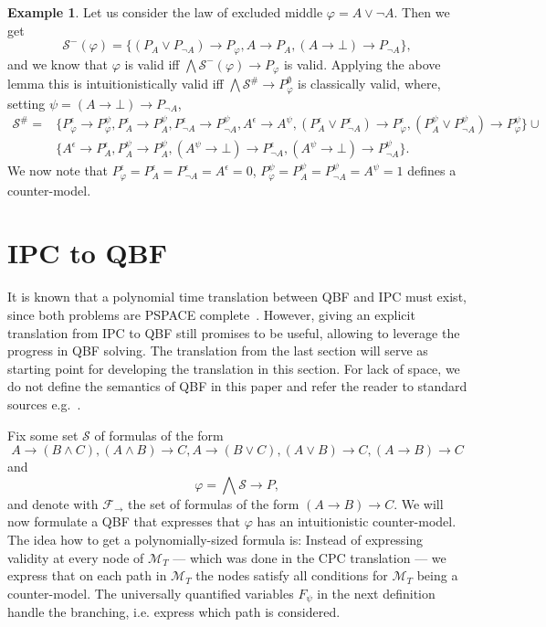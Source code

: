 \documentclass[a4paper,12pt]{report}
\theoremstyle{definition}
\theoremstyle{definition}
\theoremstyle{definition}
\theoremstyle{definition}
\theoremstyle{definition}
\theoremstyle{definition}
\newtheorem{example}[theorem]{Example}
\theoremstyle{definition}
\begin{document}
	\begin{example}
		Let us consider the law of excluded middle $\varphi = A\vee\neg A$. Then we get
		$$\mathcal S^-(\varphi) = \{(P_A\vee P_{\neg A})\to P_\varphi, A\to P_A, (A\to \bot)\to P_{\neg A}\},$$
		and we know that $\varphi$ is valid iff $\bigwedge \mathcal S^-(\varphi)\to P_\varphi$ is valid. Applying the above lemma this is intuitionistically valid iff $\bigwedge\mathcal S^\#\to P^\emptyset_\varphi$ is classically valid, where, setting $\psi = (A\to \bot)\to P_{\neg A}$,
		\begin{align*}
			\mathcal S^\# =&\{P_\varphi^\epsilon\to P_\varphi^{\psi}, P_A^\epsilon\to P_A^{\psi},P_{\neg A}^\epsilon\to P_{\neg A}^{\psi},A^\epsilon\to A^{\psi}, (P_A^\epsilon\vee P_{\neg A}^\epsilon)\to P_\varphi^\epsilon, (P_A^{\psi}\vee P_{\neg A}^{\psi})\to P_\varphi^{\psi}\}\cup\\ &\{A^\epsilon\to P_A^\epsilon, P_A^{\psi}\to P_A^{\psi}, (A^{\psi}\to \bot)\to P_{\neg A}^\epsilon, (A^{\psi}\to \bot)\to P_{\neg A}^{\psi}\}.
		\end{align*}
		We now note that $P_\varphi^\epsilon  = P_A^\epsilon = P_{\neg A}^\epsilon = A^\epsilon = 0$, $P_{\varphi}^{\psi} = P_A^{\psi} =  P_{\neg A}^{\psi} = A^{\psi} = 1$ defines a counter-model.
	\end{example}
	
	\section{IPC to QBF}
	
	It is known that a polynomial time translation between QBF and IPC must exist, since both problems are PSPACE complete~\cite{garey1979computers, statman1979intuitionistic}.
	However, giving an explicit translation from IPC to QBF still promises to be useful, allowing to leverage the progress in QBF solving.
	The translation from the last section will serve as starting point for developing the translation in this section.
	For lack of space, we do not define the semantics of QBF in this paper and refer the reader to standard sources e.g.~\cite{series/faia/2009-185}.
	
	Fix some set $\mathcal S$ of formulas of the form $$A\to (B\wedge C), (A\wedge B)\to C, A\to (B\vee C), (A\vee B)\to C, (A\to B)\to C$$and$$\varphi = \bigwedge \mathcal S\to P,$$
	and denote with $\mathcal F_\to$ the set of formulas of the form $(A\to B)\to C$. We will now formulate a QBF that expresses that $\varphi$ has an intuitionistic counter-model. The idea how to get a polynomially-sized formula is: Instead of expressing validity at every node of $\mathcal M_T$ --- which was done in the CPC translation --- we express that on each path in $\mathcal M_T$ the nodes satisfy all conditions for $\mathcal M_T$ being a counter-model. The universally quantified variables $F_\psi$ in the next definition handle the branching, i.e. express which path is considered.
	
\end{document}
